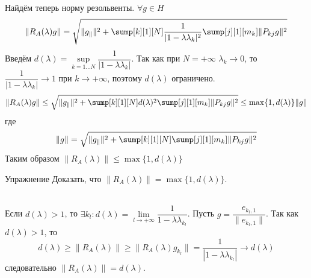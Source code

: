 \documentclass[14pt]{extarticle}
\begin{document}
Найдём теперь норму резольвенты.
$\forall g \in H$
$$
\|R_A(\lambda)g\| = \sqrt{\|g_\parallel\|^2 + \sump[k][1][N] \dfrac{1}{|1 - \lambda \lambda_k|
^2} \sump[j][1][m_k]\|P_{kj}g\|^2}
$$
Введём $d(\lambda) = \sup\limits_{k = 1 \dots N} \dfrac{1}{|1 - \lambda \lambda_k|}$.
Так как при $N = +\infty$ $\lambda_k \to 0$, то $\dfrac{1}{|1 - \lambda \lambda_k|} \to 1$ 
при $k \to +\infty$, поэтому $d(\lambda)$ ограничено.
$$
\|R_A(\lambda)g\| \le \sqrt{\|g_\parallel\|^2 + \sump[k][1][N] d(\lambda)^2 \sump[j][1][m_k]\|P_{kj}g\|^2} \le \max\{1, d(\lambda)\}\|g\|
$$
где 
$$
\|g\| = \sqrt{\|g_\parallel\|^2 + \sump[k][1][N] \sump[j][1][m_k]\|P_{kj}g\|^2}
$$
Таким образом $\|R_A(\lambda)\| \le \max\{1, d(\lambda)\}$
\begin{MathCl}{Упражнение}
Доказать, что $\|R_A(\lambda)\| = \max\{1, d(\lambda)\}$.
\end{MathCl}
\\Если $d(\lambda) > 1$, то $\exists k_l\colon d(\lambda) = \lim\limits_{l \to +\infty} \dfrac{1}
{1 - \lambda\lambda_{k_l}}$.
Пусть $g = \dfrac{e_{k_l, 1}}{\|e_{k_l, 1}\|}$.
Так как $d(\lambda) > 1$, то
$$
d(\lambda) \ge \|R_A(\lambda)\| \ge \|R_A(\lambda)g_{k_l}\| = \dfrac{1}{|1 - \lambda
\lambda_{k_l}|} \to d(\lambda)
$$
следовательно $\|R_A(\lambda)\| = d(\lambda)$.
\end{document}
